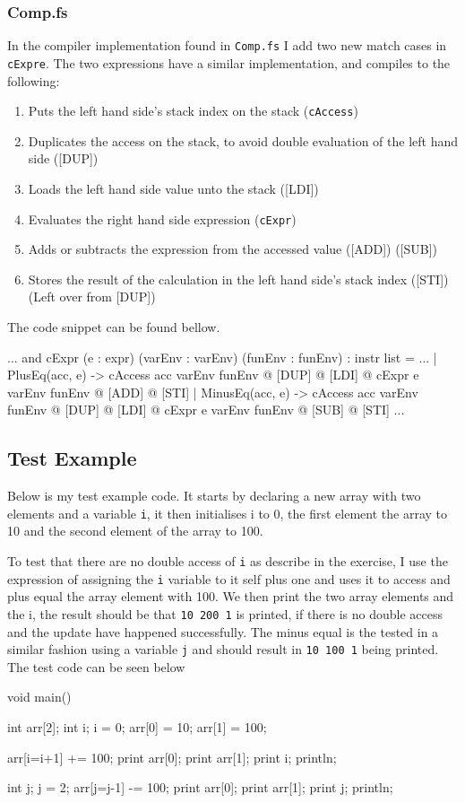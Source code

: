 \subsubsection*{Comp.fs}
In the compiler implementation found in \texttt{Comp.fs} I add two new match
cases in \texttt{cExpre}. The two expressions have a similar implementation, and
compiles to the following:
\begin{enumerate}
    \item Puts the left hand side's stack index on the stack (\texttt{cAccess})
    \item Duplicates the access on the stack, to avoid double evaluation of the
        left hand side ([DUP])
    \item Loads the left hand side value unto the stack ([LDI])
    \item Evaluates the right hand side expression (\texttt{cExpr})
    \item Adds or subtracts the expression from the accessed value ([ADD])
        ([SUB]) 
    \item Stores the result of the calculation in the left hand side's stack
        index ([STI]) (Left over from [DUP])
\end{enumerate}
The code snippet can be found bellow.
\begin{fs}
...
and cExpr (e : expr) (varEnv : varEnv) (funEnv : funEnv) : instr list = 
...
    | PlusEq(acc, e)  -> cAccess acc varEnv funEnv @ [DUP] @ [LDI] @ cExpr e varEnv funEnv @ [ADD] @ [STI]
    | MinusEq(acc, e)  -> cAccess acc varEnv funEnv @ [DUP] @ [LDI] @ cExpr e varEnv funEnv @ [SUB] @ [STI]
...
\end{fs}

\subsection{Test Example}
Below is my test example code. It starts by declaring a new array with two
elements and a variable \texttt{i}, it then initialises i to 0, the first element the
array to 10 and the second element of the array to 100.

To test that there are no double access of \texttt{i} as describe in the
exercise, I use the expression of assigning the \texttt{i} variable to it self
plus one and uses it to access and plus equal the array element with 100. We
then print the two array elements and the i, the result should be that
\texttt{10 200 1} is printed, if there is no double access and the update have
happened successfully. The minus equal is the tested in a similar fashion using
a variable \texttt{j} and should result in \texttt{10 100 1} being printed. The
test code can be seen below
\begin{ccode}
void main() {
    int arr[2];
    int i;
    i = 0;
    arr[0] = 10;
    arr[1] = 100;
    
    arr[i=i+1] += 100;
    print arr[0];
    print arr[1];
    print i;
    println;

    int j;
    j = 2;
    arr[j=j-1] -= 100;
    print arr[0];
    print arr[1];
    print j;
    println;
}
\end{ccode}
